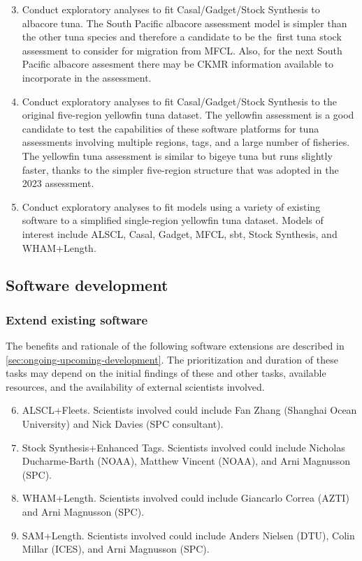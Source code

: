 \documentclass{SCreport}
\begin{document}
\begin{enumerate}\setcounter{enumi}{2}
  \item Conduct exploratory analyses to fit Casal/Gadget/Stock Synthesis to
  albacore tuna. The South Pacific albacore assessment model is simpler than the
  other tuna species and therefore a candidate to be the~first tuna stock
  assessment to consider for migration from MFCL. Also, for the next South
  Pacific albacore assesment there may be CKMR information available to
  incorporate in the assessment.
  \item Conduct exploratory analyses to fit Casal/Gadget/Stock Synthesis to the
  original five-region yellowfin tuna dataset. The yellowfin assessment is a
  good candidate to test the capabilities of these software platforms for tuna
  assessments involving multiple regions, tags, and a large number of fisheries.
  The yellowfin tuna assessment is similar to bigeye tuna but runs slightly
  faster, thanks to the simpler \mbox{five-region} structure that was adopted in
  the 2023 assessment.
  \item Conduct exploratory analyses to fit models using a variety of existing
  software to a simplified single-region yellowfin tuna dataset. Models of
  interest include ALSCL, Casal, Gadget, MFCL, sbt, Stock Synthesis, and
  WHAM+Length.
\end{enumerate}

\subsection{Software development}

\subsubsection{Extend existing software}

The benefits and rationale of the following software extensions are described in
\autoref{sec:ongoing-upcoming-development}. The prioritization and duration of
these tasks may depend on the initial findings of these and other tasks,
available resources, and the availability of external scientists involved.

\begin{enumerate}\setcounter{enumi}{5}
  \item ALSCL+Fleets. Scientists involved could include Fan Zhang (Shanghai
  Ocean University) and Nick Davies (SPC consultant).
  \item Stock Synthesis+Enhanced Tags. Scientists involved could include
  Nicholas Ducharme-Barth (NOAA), Matthew Vincent (NOAA), and Arni Magnusson
  (SPC).
  \item WHAM+Length. Scientists involved could include Giancarlo Correa (AZTI)
  and Arni Magnusson (SPC).
  \item SAM+Length. Scientists involved could include Anders Nielsen (DTU),
  Colin Millar (ICES), and Arni Magnusson (SPC).
\end{enumerate}
\end{document}

